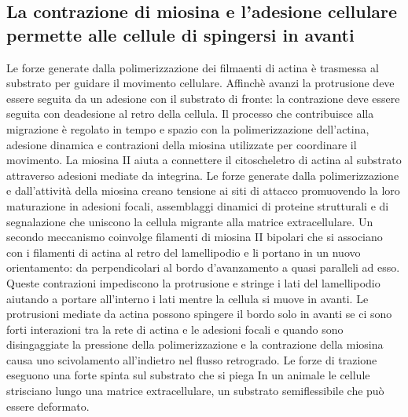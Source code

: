 \subsection{La contrazione di miosina e l'adesione cellulare permette alle cellule di spingersi in avanti}
Le forze generate dalla polimerizzazione dei filmaenti di actina \`e trasmessa al substrato per guidare il movimento cellulare. Affinch\`e avanzi la protrusione deve essere seguita da un
adesione con il substrato di fronte: la contrazione deve essere seguita con deadesione al retro della cellula. Il processo che contribuisce alla migrazione \`e regolato in tempo e 
spazio con la polimerizzazione dell'actina, adesione dinamica e contrazioni della miosina utilizzate per coordinare il movimento. La miosina II aiuta a connettere il citoscheletro di 
actina al substrato attraverso adesioni mediate da integrina. Le forze generate dalla polimerizzazione e dall'attivit\`a della miosina creano tensione ai siti di attacco promuovendo
la loro maturazione in adesioni focali, assemblaggi dinamici di proteine strutturali e di segnalazione che uniscono la cellula migrante alla matrice extracellulare. Un secondo 
meccanismo coinvolge filamenti di miosina II bipolari che si associano con i filamenti di actina al retro del lamellipodio e li portano in un nuovo orientamento: da perpendicolari al
bordo d'avanzamento a quasi paralleli ad esso. Queste contrazioni impediscono la protrusione e stringe i lati del lamellipodio aiutando a portare all'interno i lati mentre la cellula
si muove in avanti. Le protrusioni mediate da actina possono spingere il bordo solo in avanti se ci sono forti interazioni tra la rete di actina e le adesioni focali e quando sono 
disingaggiate la pressione della polimerizzazione e la contrazione della miosina causa uno scivolamento all'indietro nel flusso retrogrado. Le forze di trazione eseguono una forte spinta
sul substrato che si piega In un animale le cellule strisciano lungo una matrice extracellulare, un substrato semiflessibile che pu\`o essere deformato. 

